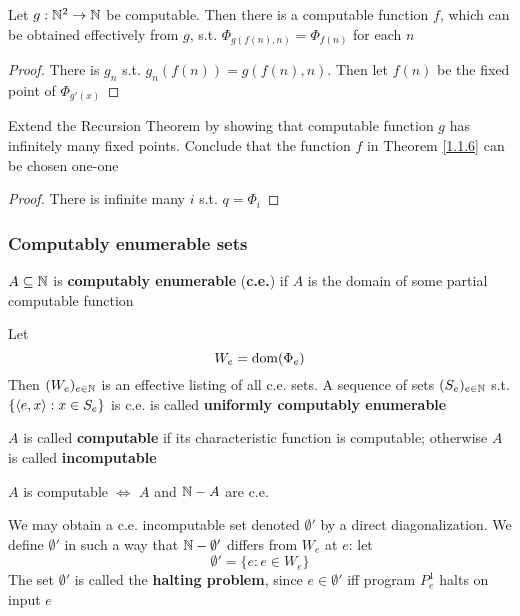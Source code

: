 \documentclass[11pt]{article}
\begin{document}
\begin{theorem}
\label{1.1.6}
Let \(g:\mathbb{N}^2\to\mathbb{N}\) be computable. Then there is a computable function \(f\), which can be obtained
effectively from \(g\), s.t. \(\Phi_{g(f(n),n)}=\Phi_{f(n)}\) for each \(n\)
\end{theorem}

\begin{proof}
There is \(g_n\) s.t. \(g_n(f(n))=g(f(n),n)\). Then let \(f(n)\) be the fixed point of \(\Phi_{g'(x)}\)
\end{proof}

\begin{exercise}
\label{1.1.7}
Extend the Recursion Theorem by showing that computable function \(g\) has infinitely many fixed
points. Conclude that the function \(f\) in Theorem \ref{1.1.6} can be chosen one-one
\end{exercise}

\begin{proof}
There is infinite many \(i\) s.t. \(q=\Phi_i\)
\end{proof}
\subsubsection{Computably enumerable sets}
\label{sec:org5e81737}
\begin{definition}[]
\(A\subseteq\mathbb{N}\) is \textbf{computably enumerable} (\textbf{c.e.}) if \(A\) is the domain of some partial computable function
\end{definition}

Let
\begin{equation*}
W_e=\operatorname{dom}(\Phi_e)
\end{equation*}
Then \((W_e)_{e\in\mathbb{N}}\) is an effective listing of all c.e. sets. A sequence of sets \((S_e)_{e\in\mathbb{N}}\)
s.t. \(\{\langle e,x\rangle:x\in S_e\}\) is c.e. is called \textbf{uniformly computably enumerable}

\(A\) is called \textbf{computable} if its characteristic function is computable; otherwise \(A\) is
called \textbf{incomputable}

\begin{proposition}[]
\(A\) is computable \(\Leftrightarrow\) \(A\) and \(\mathbb{N}-A\) are c.e.
\end{proposition}

We may obtain a c.e. incomputable set denoted \(\emptyset'\) by a direct diagonalization. We
define \(\emptyset'\) in such a way that \(\mathbb{N}-\emptyset'\) differs from \(W_e\) at \(e\): let
\begin{equation*}
\emptyset'=\{e:e\in W_e\}
\end{equation*}
The set \(\emptyset'\) is called the \textbf{halting problem}, since \(e\in\emptyset'\) iff program \(P_e^1\) halts on input \(e\)
\end{document}
